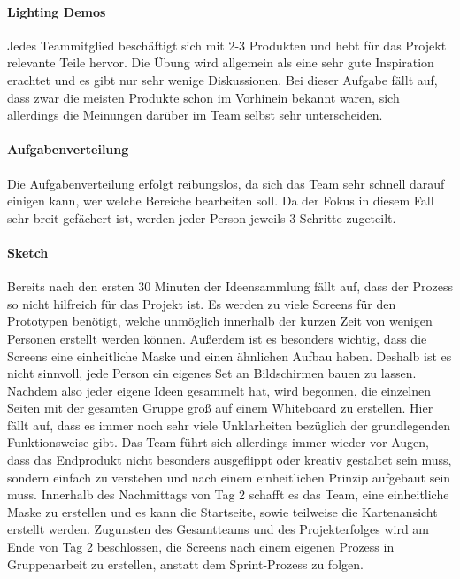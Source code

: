 \paragraph{Lighting Demos}
%
Jedes Teammitglied beschäftigt sich mit 2-3 Produkten und hebt für das Projekt relevante Teile hervor. Die Übung wird allgemein als eine sehr gute Inspiration erachtet und es gibt nur sehr wenige Diskussionen. 
Bei dieser Aufgabe fällt auf, dass zwar die meisten Produkte schon im Vorhinein bekannt waren, sich allerdings die Meinungen darüber im Team selbst sehr unterscheiden.

\paragraph{Aufgabenverteilung}
Die Aufgabenverteilung erfolgt reibungslos, da sich das Team sehr schnell darauf einigen kann, wer welche Bereiche bearbeiten soll. Da der Fokus in diesem Fall sehr breit gefächert ist, werden jeder Person jeweils 3 Schritte zugeteilt.

\paragraph{Sketch}
Bereits nach den ersten 30 Minuten der Ideensammlung fällt auf, dass der Prozess so nicht hilfreich für das Projekt ist. Es werden zu viele Screens für den Prototypen benötigt, welche unmöglich innerhalb der kurzen Zeit von wenigen Personen erstellt werden können. Außerdem ist es besonders wichtig, dass die Screens eine einheitliche Maske und einen ähnlichen Aufbau haben. Deshalb ist es nicht sinnvoll, jede Person ein eigenes Set an Bildschirmen bauen zu lassen. Nachdem also jeder eigene Ideen gesammelt hat, wird begonnen, die einzelnen Seiten mit der gesamten Gruppe groß auf einem Whiteboard zu erstellen. Hier fällt auf, dass es immer noch sehr viele Unklarheiten bezüglich der grundlegenden Funktionsweise gibt. Das Team führt sich allerdings immer wieder vor Augen, dass das Endprodukt nicht besonders ausgeflippt oder kreativ gestaltet sein muss, sondern einfach zu verstehen und nach einem einheitlichen Prinzip aufgebaut sein muss. Innerhalb des Nachmittags von Tag 2 schafft es das Team, eine einheitliche Maske zu erstellen und es kann die Startseite, sowie teilweise die Kartenansicht erstellt werden.
Zugunsten des Gesamtteams und des Projekterfolges wird am Ende von Tag 2 beschlossen, die Screens nach einem eigenen Prozess in Gruppenarbeit zu erstellen, anstatt dem Sprint-Prozess zu folgen.

